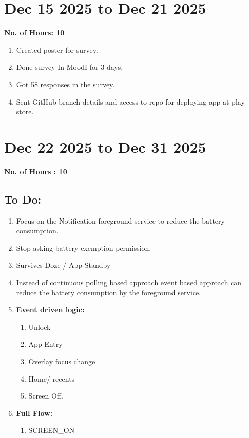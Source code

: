 \documentclass[12pt]{article}
\begin{document}
\begin{enumerate}
    \section{Dec 15 2025 to Dec 21 2025}
    {\bf No. of Hours: 10}
    \begin{enumerate}
        \item Created poster for survey.
        \item Done survey In MoodI for 3 days.
        \item Got 58 responses in the survey. 
        \item Sent GitHub branch details and access to repo for deploying app at play store.
    \end{enumerate}
    \section{Dec 22 2025 to Dec 31 2025}
    {\bf No. of Hours : 10}
    \subsection{To Do:}
    \begin{enumerate}
        \item Focus on the Notification foreground service to reduce the battery consumption.
        \item Stop asking battery exemption permission.
        \item Survives Doze / App Standby
        \item Instead of continuous polling based approach event based approach can reduce the battery consumption by the foreground service.
        \item \textbf{Event driven logic: }
        \begin{enumerate}
            \item Unlock
            \item App Entry
            \item Overlay focus change
            \item Home/ recents
            \item Screen Off.
        \end{enumerate}
        \item \textbf{Full Flow: }
        \begin{enumerate}
            \item SCREEN\_ON
     

\end{enumerate}
\end{enumerate}
\end{enumerate}
\end{document}
